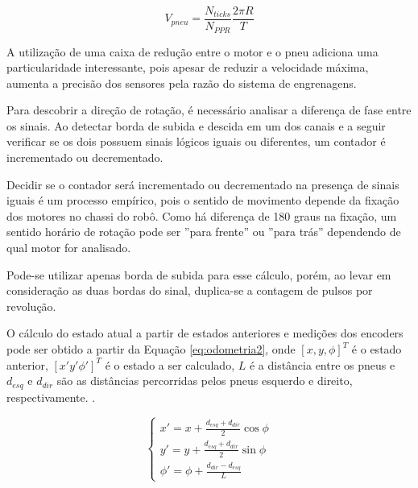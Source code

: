 

\begin{equation}
	\label{eq:odometria1}
	V_{pneu} = \frac{N_{ticks}}{N_{PPR}} \frac{2\pi R}{T}
\end{equation}

A utilização de uma caixa de redução entre o motor e o pneu adiciona
uma particularidade interessante, pois apesar de reduzir a velocidade
máxima, aumenta a precisão dos sensores pela razão do sistema de 
engrenagens. 
	
Para descobrir a direção de rotação, é necessário analisar a diferença 
de fase entre os sinais. Ao detectar borda de subida e descida em 
um dos canais e a seguir verificar se os dois possuem sinais lógicos 
iguais ou diferentes, um contador é incrementado ou decrementado. 

Decidir se o contador será incrementado ou decrementado na presença de
sinais iguais é um processo empírico, pois o sentido de movimento 
depende da fixação dos motores no chassi do robô. Como há diferença 
de 180 graus na fixação, um sentido horário de rotação pode ser ''para 
frente'' ou ''para trás'' dependendo de qual motor for analisado.

Pode-se utilizar apenas borda de subida para esse cálculo, porém, 
ao levar em consideração as duas bordas do sinal, duplica-se
a contagem de pulsos por revolução.

O cálculo do estado atual a partir de estados anteriores e medições
dos encoders pode ser obtido a partir da Equação \ref{eq:odometria2},
onde $[x,y,\phi]^T$ é o estado anterior, $[x' y' \phi']^T$ é o estado
a ser calculado, $L$ é a distância entre os pneus e $d_{esq}$ e 
$d_{dir}$ são as distâncias percorridas pelos pneus esquerdo e direito, 
respectivamente. \cite{art:odometria1}.

\begin{equation}
	\label{eq:odometria2}
	\left \{ \begin{matrix} x' = x + \frac{d_{esq} + d_{dir}}{2} \cos{\phi}
	\\
	y' = y + \frac{d_{esq} + d_{dir}}{2} \sin{\phi}
	\\
	\phi' = \phi + \frac{d_{dir} - d_{esq}}{L} \end{matrix} \right.
\end{equation}



